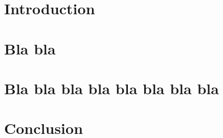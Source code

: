 \documentclass{book}
\begin{document}
\chapter*{Introduction}

\chapter{Bla bla}

\chapter{Bla bla bla bla bla bla bla bla}

\chapter*{Conclusion}
\end{document}
